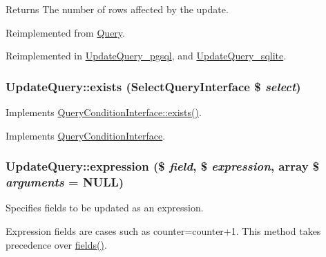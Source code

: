 \begin{DoxyReturn}{Returns}
The number of rows affected by the update. 
\end{DoxyReturn}


Reimplemented from \hyperlink{classQuery_a9f2326187a94f3337a7838687b1e6929}{Query}.

Reimplemented in \hyperlink{classUpdateQuery__pgsql_a1c8ce7ceb61c265cc8b9cfce4afb7648}{UpdateQuery\_\-pgsql}, and \hyperlink{classUpdateQuery__sqlite_a7919e3bbb318f3dba23570dbdda80fd6}{UpdateQuery\_\-sqlite}.\hypertarget{classUpdateQuery_a04537fd021194c135a33c2e2f15d8493}{
\subsubsection[{exists}]{\setlength{\rightskip}{0pt plus 5cm}UpdateQuery::exists ({\bf SelectQueryInterface} \$ {\em select})}}
\label{classUpdateQuery_a04537fd021194c135a33c2e2f15d8493}
Implements \hyperlink{interfaceQueryConditionInterface_a27a52b6e84393275ad2c54eaf1bd764a}{QueryConditionInterface::exists()}. 

Implements \hyperlink{interfaceQueryConditionInterface_a27a52b6e84393275ad2c54eaf1bd764a}{QueryConditionInterface}.\hypertarget{classUpdateQuery_a57dc3eee898b5c5ddc21cb70e3978d3f}{
\subsubsection[{expression}]{\setlength{\rightskip}{0pt plus 5cm}UpdateQuery::expression (\$ {\em field}, \/  \$ {\em expression}, \/  array \$ {\em arguments} = {\ttfamily NULL})}}
\label{classUpdateQuery_a57dc3eee898b5c5ddc21cb70e3978d3f}
Specifies fields to be updated as an expression.

Expression fields are cases such as counter=counter+1. This method takes precedence over \hyperlink{classUpdateQuery_a5d02f111de8cfe803a352c8ef0f89789}{fields()}.


